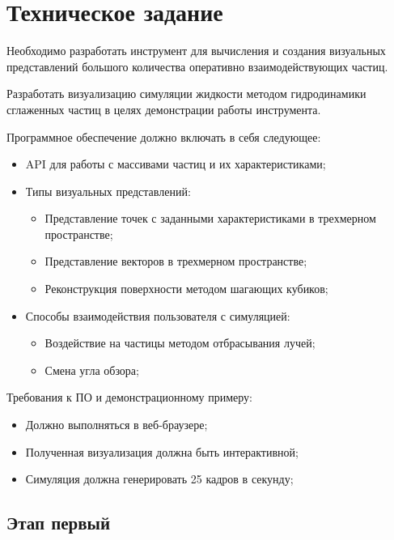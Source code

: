 \newpage
\section{Техническое задание}

Необходимо разработать инструмент для вычисления и создания визуальных 
представлений большого количества оперативно взаимодействующих частиц.

Разработать визуализацию симуляции жидкости методом гидродинамики сглаженных
частиц в целях демонстрации работы инструмента.

Программное обеспечение должно включать в себя следующее:

\begin{itemize}
  \item API для работы с массивами частиц и их характеристиками;
  \item Типы визуальных представлений:
    \begin{itemize}
      \item Представление точек с заданными характеристиками в трехмерном пространстве;
      \item Представление векторов в трехмерном пространстве;
      \item Реконструкция поверхности методом шагающих кубиков;
    \end{itemize}
  \item Способы взаимодействия пользователя с симуляцией:
    \begin{itemize}
      \item Воздействие на частицы методом отбрасывания лучей;
      \item Смена угла обзора;
    \end{itemize}
\end{itemize}

Требования к ПО и демонстрационному примеру:

\begin{itemize}
  \item Должно выполняться в веб-браузере;
  \item Полученная визуализация должна быть интерактивной;
  \item Симуляция должна генерировать 25 кадров в секунду;
\end{itemize}

\subsection{Этап первый}

